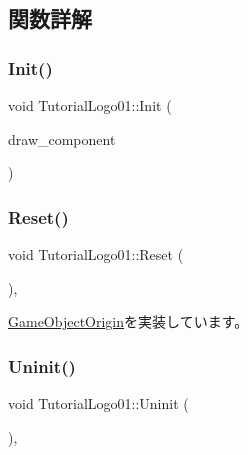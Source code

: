 \subsection{関数詳解}
\mbox{\label{class_tutorial_logo01_a6c9e07a064789ac5f5e9c73832ce56d2}} 
\subsubsection{\texorpdfstring{Init()}{Init()}}
{\footnotesize\ttfamily void Tutorial\+Logo01\+::\+Init (\begin{DoxyParamCaption}\item[{\mbox{\hyperlink{class_draw_component}{Draw\+Component}} $\ast$}]{draw\+\_\+component }\end{DoxyParamCaption})}

\mbox{\label{class_tutorial_logo01_a01515b3f54e6731e42d60af5320ff7eb}} 
\subsubsection{\texorpdfstring{Reset()}{Reset()}}
{\footnotesize\ttfamily void Tutorial\+Logo01\+::\+Reset (\begin{DoxyParamCaption}{ }\end{DoxyParamCaption})\hspace{0.3cm}{\ttfamily [override]}, {\ttfamily [virtual]}}



\mbox{\hyperlink{class_game_object_origin_af9af378a4fd9028316a6fdb461ed6a10}{Game\+Object\+Origin}}を実装しています。

\mbox{\label{class_tutorial_logo01_aa6fd636ad745d8712ace1c82da285828}} 
\subsubsection{\texorpdfstring{Uninit()}{Uninit()}}
{\footnotesize\ttfamily void Tutorial\+Logo01\+::\+Uninit (\begin{DoxyParamCaption}{ }\end{DoxyParamCaption})\hspace{0.3cm}{\ttfamily [override]}, {\ttfamily [virtual]}}



